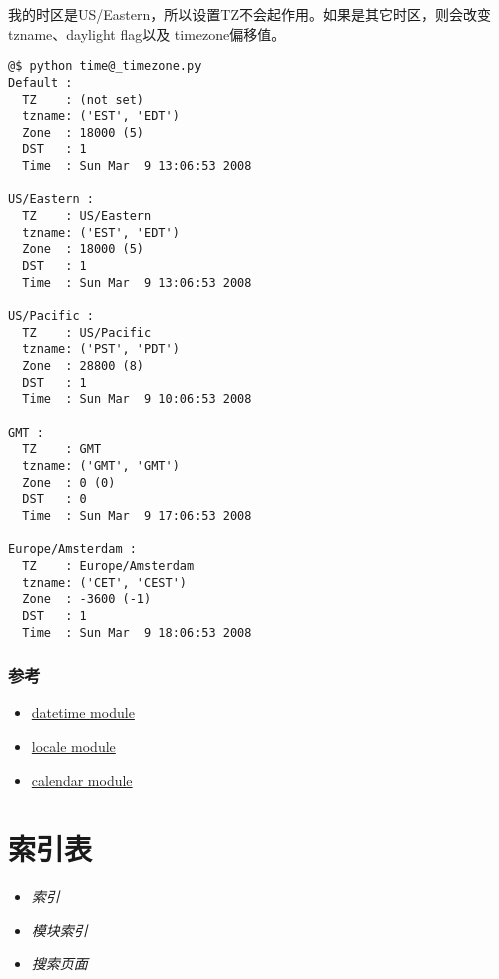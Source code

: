 \documentclass[a4paper,10pt,english]{manual}
\begin{document}
我的时区是US/Eastern，所以设置TZ不会起作用。如果是其它时区，则会改变tzname、daylight flag以及 timezone偏移值。

\begin{Verbatim}[commandchars=@\[\]]
@$ python time@_timezone.py
Default :
  TZ    : (not set)
  tzname: ('EST', 'EDT')
  Zone  : 18000 (5)
  DST   : 1
  Time  : Sun Mar  9 13:06:53 2008

US/Eastern :
  TZ    : US/Eastern
  tzname: ('EST', 'EDT')
  Zone  : 18000 (5)
  DST   : 1
  Time  : Sun Mar  9 13:06:53 2008

US/Pacific :
  TZ    : US/Pacific
  tzname: ('PST', 'PDT')
  Zone  : 28800 (8)
  DST   : 1
  Time  : Sun Mar  9 10:06:53 2008

GMT :
  TZ    : GMT
  tzname: ('GMT', 'GMT')
  Zone  : 0 (0)
  DST   : 0
  Time  : Sun Mar  9 17:06:53 2008

Europe/Amsterdam :
  TZ    : Europe/Amsterdam
  tzname: ('CET', 'CEST')
  Zone  : -3600 (-1)
  DST   : 1
  Time  : Sun Mar  9 18:06:53 2008
\end{Verbatim}


\subsection{参考}
\begin{itemize}
\item {} 
\href{http://docs.python.org/lib/module-datetime.html}{datetime module}

\item {} 
\href{http://docs.python.org/lib/module-locale.html}{locale module}

\item {} 
\href{http://docs.python.org/lib/module-calendar.html}{calendar module}

\end{itemize}


\chapter{索引表}
\begin{itemize}
\item {} 
\emph{索引}

\item {} 
\emph{模块索引}

\item {} 
\emph{搜索页面}

\end{itemize}


\renewcommand{\indexname}{Module Index}
\printmodindex
\renewcommand{\indexname}{Index}
\printindex
\end{document}
